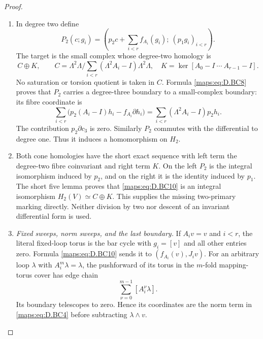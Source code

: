 \begin{proof}
\begin{enumerate}[label=\arabic*.,leftmargin=*]
\item In degree two define
\[
 P_2(c;g_i)=
 \left(p_2c+\sum_{i<r}f_{A_i}(g_i);\
                                  (p_1g_i)_{i<r}\right).
                                                        \tag{D.BC10}\label{maps:eq:D.BC10}
\]
The target is the small complex whose degree-two
homology is
\[
 C\oplus K,\qquad
 C=\Lambda^2\Lambda/
          \sum_{i<r}(\Lambda^2A_i-I)\Lambda^2\Lambda,
 \quad
 K=\ker[A_0-I\ \cdots\ A_{r-1}-I].
                                                        \tag{D.BC11}\label{maps:eq:D.BC11}
\]
No saturation or torsion quotient is taken in $C$.
Formula \eqref{maps:eq:D.BC8} proves that $P_2$ carries a
degree-three boundary to a small-complex boundary:
its fibre coordinate is
\[
 \sum_{i<r}\bigl(p_2(A_i-I)h_i-f_{A_i}\partial h_i\bigr)
       =\sum_{i<r}(\Lambda^2A_i-I)p_2h_i .
                                                        \tag{D.BC12}\label{maps:eq:D.BC12}
\]
The contribution $p_2\partial c_3$ is zero.
Similarly $P_2$ commutes with the differential
to degree one. Thus it induces a homomorphism
on $H_2$.

\item Both cone homologies have the short exact
sequence with left term the degree-two fibre
coinvariant and right term $K$. On the left
$P_2$ is the integral isomorphism induced by
$p_2$, and on the right it is the identity
induced by $p_1$. The short five lemma proves
that \eqref{maps:eq:D.BC10} is an integral isomorphism
$H_2(V)\simeq C\oplus K$. This supplies the
missing two-primary marking directly. Neither
division by two nor descent of an invariant
differential form is used.

\item \emph{Fixed sweeps, norm sweeps, and the last boundary.}
If $A_i v=v$ and $i<r$, the literal fixed-loop
torus is the bar cycle with $g_i=[v]$ and
all other entries zero. Formula \eqref{maps:eq:D.BC10} sends
it to $(f_{A_i}(v),J_iv)$.
For an arbitrary loop $\lambda$ with
$A_i^m\lambda=\lambda$, the pushforward of
its torus in the $m$-fold mapping-torus cover
has edge chain
\[
                        \sum_{\nu=0}^{m-1}[A_i^\nu\lambda].
                                                        \tag{D.BC13}\label{maps:eq:D.BC13}
\]
Its boundary telescopes to zero. Hence its
coordinates are the norm term in \eqref{maps:eq:D.BC4}
before subtracting $\lambda\wedge v$.


\end{enumerate}
\end{proof}
